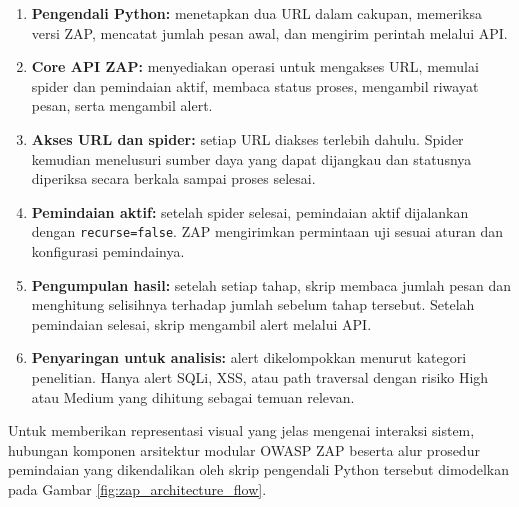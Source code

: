 \begin{enumerate}
    \item \textbf{Pengendali Python:} menetapkan dua URL dalam cakupan, memeriksa versi ZAP, mencatat jumlah pesan awal, dan mengirim perintah melalui API.
    \item \textbf{Core API ZAP:} menyediakan operasi untuk mengakses URL, memulai spider dan pemindaian aktif, membaca status proses, mengambil riwayat pesan, serta mengambil alert.
    \item \textbf{Akses URL dan spider:} setiap URL diakses terlebih dahulu. Spider kemudian menelusuri sumber daya yang dapat dijangkau dan statusnya diperiksa secara berkala sampai proses selesai.
    \item \textbf{Pemindaian aktif:} setelah spider selesai, pemindaian aktif dijalankan dengan \texttt{recurse=false}. ZAP mengirimkan permintaan uji sesuai aturan dan konfigurasi pemindainya.
    \item \textbf{Pengumpulan hasil:} setelah setiap tahap, skrip membaca jumlah pesan dan menghitung selisihnya terhadap jumlah sebelum tahap tersebut. Setelah pemindaian selesai, skrip mengambil alert melalui API.
    \item \textbf{Penyaringan untuk analisis:} alert dikelompokkan menurut kategori penelitian. Hanya alert SQLi, XSS, atau path traversal dengan risiko High atau Medium yang dihitung sebagai temuan relevan.
\end{enumerate}

Untuk memberikan representasi visual yang jelas mengenai interaksi sistem, hubungan komponen arsitektur modular OWASP ZAP beserta alur prosedur pemindaian yang dikendalikan oleh skrip pengendali Python tersebut dimodelkan pada Gambar \ref{fig:zap_architecture_flow}.

